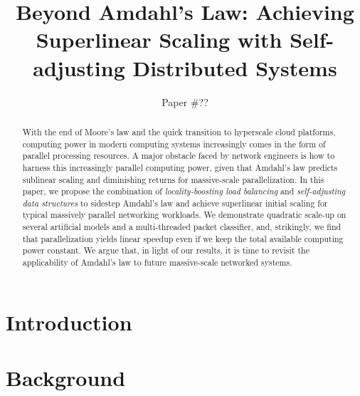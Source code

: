 \documentclass[letterpaper,twocolumn,10pt]{article}
\begin{document}



\title{Beyond Amdahl's Law: Achieving Superlinear Scaling with Self-adjusting Distributed Systems}

\author{Paper \#??} %

\maketitle

\tableofcontents

\begin{abstract}
  With the end of Moore's law and the quick transition to hyperscale cloud platforms, computing power in modern computing systems increasingly comes in the form of parallel processing resources.  A major obstacle faced by network engineers is how to harness this increasingly parallel computing power, given that Amdahl's law predicts sublinear scaling and diminishing returns for massive-scale parallelization.  In this paper, we propose the combination of \emph{locality-boosting load balancing} and \emph{self-adjusting data structures} to sidestep Amdahl's law and achieve superlinear initial scaling for typical massively parallel networking workloads. We demonstrate quadratic scale-up on several artificial models and a multi-threaded packet classifier, and, strikingly, we find that parallelization yields linear speedup even if we keep the total available computing power constant. We argue that, in light of our results, it is time to revisit the applicability of Amdahl's law to future massive-scale networked systems.
\end{abstract}

\section{Introduction}\label{sec:introduction}

\section{Background}\label{sec:background}
\end{document}
